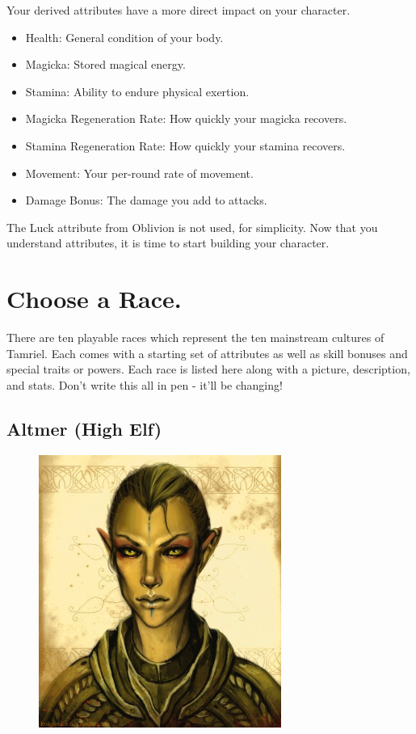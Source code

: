 \documentclass[12pt]{book}
\begin{document}
Your derived attributes have a more direct impact on your character.
\begin{itemize}
	\item Health: General condition of your body.
	\item Magicka: Stored magical energy.
	\item Stamina: Ability to endure physical exertion.
	\item Magicka Regeneration Rate: How quickly your magicka recovers.
	\item Stamina Regeneration Rate: How quickly your stamina recovers.
	\item Movement: Your per-round rate of movement.
	\item Damage Bonus: The damage you add to attacks.
\end{itemize}
The Luck attribute from Oblivion is not used, for simplicity. Now that you understand attributes, it is time to start building your character.

\section{Choose a Race.}
There are ten playable races which represent the ten mainstream cultures of Tamriel. Each comes with a starting set of attributes as well as skill bonuses and special traits or powers. Each race is listed here along with a picture, description, and stats. Don't write this all in pen - it'll be changing!

\subsection{Altmer (High Elf)}
\begin{figure}
	\includegraphics[width=\textwidth]{Altmer.png}
\end{figure}
\end{document}
